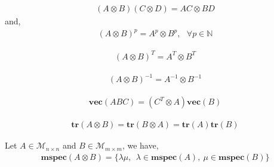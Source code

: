 \begin{proposition}
\begin{align}
( A \otimes B ) ( C \otimes D ) = AC \otimes BD
\end{align}
and,
\begin{align}
( A \otimes B ) ^p = A^p \otimes B^p,~~~\forall p \in \mathbb{N}
\end{align}
\end{proposition}

\begin{proposition}
\begin{align}
( A \otimes B )^T = A^T \otimes B^T
\end{align}
\end{proposition}

\begin{proposition}
\begin{align}
( A \otimes B )^{-1} = A^{-1} \otimes B^{-1}
\end{align}
\end{proposition}

\begin{proposition}
\begin{align}
\label{kronecker_vec_abc}
\mathbf{vec} ( ABC ) = ( C^T \otimes A ) \mathbf{vec} ( B )
\end{align}
\end{proposition}

\begin{proposition}
\begin{align}
\mathbf{tr} ( A \otimes B ) = \mathbf{tr} ( B \otimes A ) =  \mathbf{tr} ( A ) \mathbf{tr} ( B )
\end{align}
\end{proposition}

\begin{proposition}
Let $A \in \mathcal{M}_{n \times n}$ and $B \in \mathcal{M}_{m \times m}$, we have,
\begin{align}
\label{kronecker_prod_spec}
\mathbf{mspec} ( A \otimes B ) = \{ \lambda \mu,~~\lambda \in \mathbf{mspec}(A),~\mu \in \mathbf{mspec}(B) \}
\end{align}
\end{proposition}


